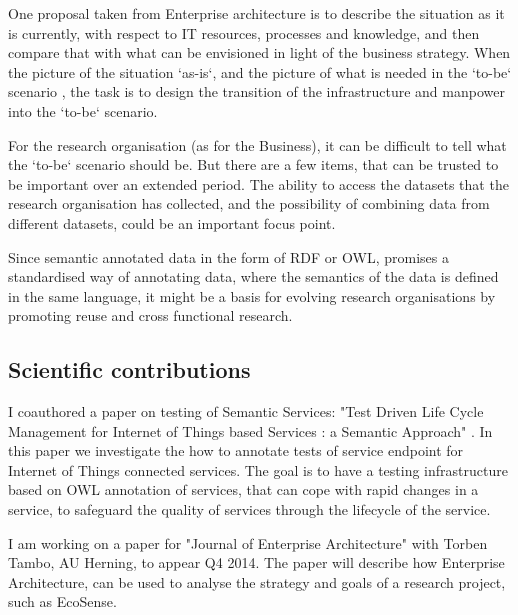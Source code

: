 One proposal taken from Enterprise architecture is to describe the situation as it is currently, with respect to IT resources, processes and knowledge, and then compare that with what can be envisioned in light of the business strategy. When the picture of the situation `as-is`, and the picture of what is needed in the `to-be` scenario \cite{Lapkin2008}, the task is to design the transition of the infrastructure and manpower into the `to-be` scenario.

For the research organisation (as for the Business), it can be difficult to tell what the `to-be` scenario should be. But there are a few items, that can be trusted to be important over an extended period. The ability to access the datasets that the research organisation has collected, and the possibility of combining data from different datasets, could be an important focus point.

Since semantic annotated data in the form of RDF or OWL, promises a standardised way of annotating data, where the semantics of the data is defined in the same language, it might be a basis for evolving research organisations by promoting reuse and cross functional research.

\subsection{Scientific contributions}

I coauthored a paper on testing of Semantic Services: "Test Driven Life Cycle Management for Internet of Things based Services : a Semantic Approach" \cite{Reetz}. In this paper we investigate the how to annotate tests of service endpoint for Internet of Things connected services. The goal is to have a testing infrastructure based on OWL annotation of services, that can cope with rapid changes in a service, to safeguard the quality of services through the lifecycle of the service.

I am working on a paper for "Journal of Enterprise Architecture" with Torben Tambo, AU Herning, to appear Q4 2014. The paper will describe how Enterprise Architecture, can be used to analyse the strategy and goals of a research project, such as EcoSense.
